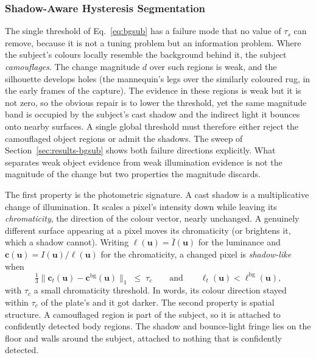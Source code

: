 \subsubsection{Shadow-Aware Hysteresis Segmentation}
\label{sec:hysteresis}

The single threshold of Eq.~\eqref{eq:bgsub} has a failure mode that no value of
$\tau_s$ can remove, because it is not a tuning problem but an information problem.
Where the subject's colours locally resemble the background behind it, the subject
\emph{camouflages}. The change magnitude $d$ over such regions is weak, and the
silhouette develops holes (the mannequin's legs over the similarly coloured rug, in
the early frames of the capture). The evidence in these regions is weak but it is
not zero, so the obvious repair is to lower the threshold, yet the same
magnitude band is occupied by the subject's cast shadow and the indirect light it
bounces onto nearby surfaces. A single global threshold must therefore either
reject the camouflaged object regions or admit the shadows. The sweep of
Section~\ref{sec:results-bgsub} shows both failure directions explicitly. What
separates weak object evidence from weak illumination evidence is not the
magnitude of the change but two properties the magnitude discards.

The first property is the photometric signature. A cast shadow is a multiplicative
change of illumination. It scales a pixel's intensity down while leaving its
\emph{chromaticity}, the direction of the colour vector, nearly unchanged. A genuinely
different surface appearing at a pixel moves its chromaticity (or brightens it, which a
shadow cannot). Writing $\ell(\mathbf{u}) = \bar I(\mathbf{u})$ for the luminance and
$\mathbf{c}(\mathbf{u}) = I(\mathbf{u}) / \ell(\mathbf{u})$ for the chromaticity, a
changed pixel is \emph{shadow-like} when
\begin{equation}
    \tfrac{1}{3}\big\| \mathbf{c}_t(\mathbf{u}) - \mathbf{c}^{\mathrm{bg}}(\mathbf{u}) \big\|_1 \;\le\; \tau_c
    \qquad \text{and} \qquad
    \ell_t(\mathbf{u}) < \ell^{\mathrm{bg}}(\mathbf{u}),
    \label{eq:shadowlike}
\end{equation}
with $\tau_c$ a small chromaticity threshold. In words, its colour direction stayed within
$\tau_c$ of the plate's and it got darker. The second property is spatial structure. A
camouflaged region is part of the subject, so it is attached to confidently
detected body regions. The shadow and bounce-light fringe lies on the floor and walls
around the subject, attached to nothing that is confidently detected.

